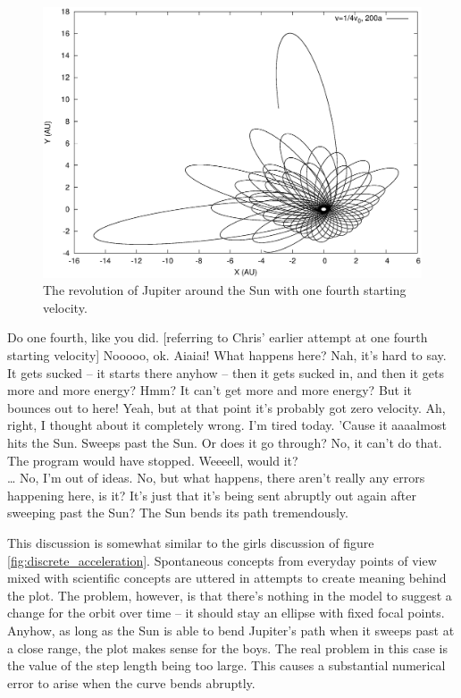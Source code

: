 \documentclass[aps,prb,floatfix,twocolumn,twoside,english]{revtex4-1}
\begin{document}
\begin{figure}[htbp]
\begin{center}
 \includegraphics[scale=0.34]{figures/flower}
 \caption{The revolution of Jupiter around the Sun with one fourth starting velocity.}
 \label{fig:jupiter}
\end{center}
\end{figure}

\begin{dialogue}
\small
{} Do one fourth, like you did. [referring to Chris' earlier attempt at one fourth starting velocity]
 Nooooo, ok. Aiaiai!
 What happens here? 
 Nah, it's hard to say. It gets sucked -- it starts there anyhow -- then it gets sucked in, and then it gets more and more energy?
 Hmm? It can't get more and more energy?
 But it bounces out to here!
 Yeah, but at that point it's probably got zero velocity. 
 Ah, right, I thought about it completely wrong. I'm tired today.
 'Cause it aaaalmost hits the Sun. Sweeps past the Sun. Or does it go through? No, it can't do that.
 The program would have stopped.
 Weeeell, would it?
\\ \dots
{} No, I'm out of ideas. 
 No, but what happens, there aren't really any errors happening here, is it? It's just that it's being sent abruptly out again after sweeping past the Sun? The Sun bends its path tremendously.
\end{dialogue}

This discussion is somewhat similar to the girls discussion of figure \ref{fig:discrete_acceleration}. Spontaneous concepts from everyday points of view mixed with scientific concepts are uttered in attempts to create meaning behind the plot. The problem, however, is that there's nothing in the model to suggest a change for the orbit over time -- it should stay an ellipse with fixed focal points. Anyhow, as long as the Sun is able to bend Jupiter's path when it sweeps past at a close range, the plot makes sense for the boys. The real problem in this case is the value of the step length being too large. This causes a substantial numerical error to arise when the curve bends abruptly.
\end{document}
